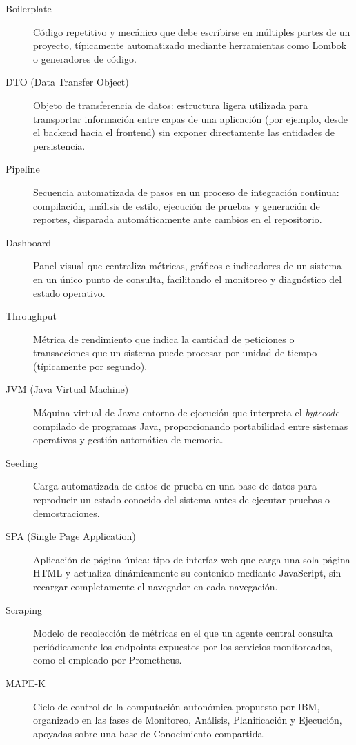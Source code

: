 \begin{description}
    \item[Boilerplate] Código repetitivo y mecánico que debe escribirse en múltiples partes de un proyecto, típicamente automatizado mediante herramientas como Lombok o generadores de código.
    \item[DTO (Data Transfer Object)] Objeto de transferencia de datos: estructura ligera utilizada para transportar información entre capas de una aplicación (por ejemplo, desde el backend hacia el frontend) sin exponer directamente las entidades de persistencia.
    \item[Pipeline] Secuencia automatizada de pasos en un proceso de integración continua: compilación, análisis de estilo, ejecución de pruebas y generación de reportes, disparada automáticamente ante cambios en el repositorio.
    \item[Dashboard] Panel visual que centraliza métricas, gráficos e indicadores de un sistema en un único punto de consulta, facilitando el monitoreo y diagnóstico del estado operativo.
    \item[Throughput] Métrica de rendimiento que indica la cantidad de peticiones o transacciones que un sistema puede procesar por unidad de tiempo (típicamente por segundo).
    \item[JVM (Java Virtual Machine)] Máquina virtual de Java: entorno de ejecución que interpreta el \textit{bytecode} compilado de programas Java, proporcionando portabilidad entre sistemas operativos y gestión automática de memoria.
    \item[Seeding] Carga automatizada de datos de prueba en una base de datos para reproducir un estado conocido del sistema antes de ejecutar pruebas o demostraciones.
    \item[SPA (Single Page Application)] Aplicación de página única: tipo de interfaz web que carga una sola página HTML y actualiza dinámicamente su contenido mediante JavaScript, sin recargar completamente el navegador en cada navegación.
    \item[Scraping] Modelo de recolección de métricas en el que un agente central consulta periódicamente los endpoints expuestos por los servicios monitoreados, como el empleado por Prometheus.
    \item[MAPE-K] Ciclo de control de la computación autonómica propuesto por IBM, organizado en las fases de Monitoreo, Análisis, Planificación y Ejecución, apoyadas sobre una base de Conocimiento compartida.
\end{description}
